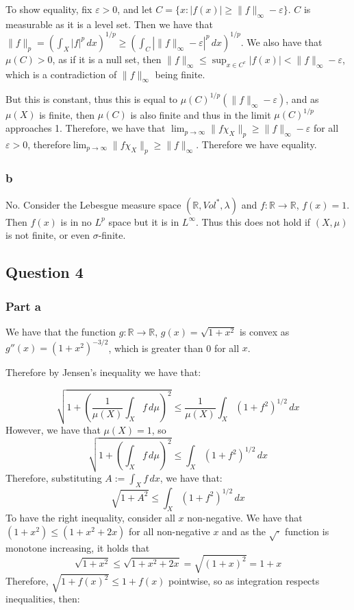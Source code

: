 \documentclass{article}
\theoremstyle{definition}
\numberwithin{theorem}{section}
\numberwithin{equation}{section}
\begin{document}
To show equality, fix $\varepsilon > 0$, and let $C = \lbrace x : |f(x)| \geq \| f \|_{\infty} - \varepsilon \rbrace$. $C$ is measurable as it is a level set. Then we have that $ \|f \|_p = \left(\int_X |f|^p \, dx \right)^{1/p} \geq \left(\int_C |\| f \|_{\infty} - \varepsilon|^p \, dx \right)^{1/p}$. We also have that $\mu(C) > 0$, as if it is a null set, then $\|f \|_{\infty} \leq \sup_{x \in C^c} |f(x)| < \|f\|_{\infty} - \varepsilon$, which is a contradiction of $\|f \|_{\infty}$ being finite. 

But this is constant, thus this is equal to $\mu(C)^{1/p}( \| f \|_{\infty} - \varepsilon)$, and as $\mu(X)$ is finite, then $\mu(C)$ is also finite and thus in the limit $\mu(C)^{1/p}$ approaches 1. Therefore, we have that $\lim_{p \rightarrow \infty} \| f \chi_X \|_p \geq \|f \|_{\infty} - \varepsilon$ for all $\varepsilon > 0$, therefore$\lim_{p \rightarrow \infty} \| f \chi_X \|_p \geq \|f \|_{\infty}$. Therefore we have equality.
\subsubsection*{b}
No. Consider the Lebesgue measure space $(\mathbb{R}, Vol^*, \lambda)$ and $f : \mathbb{R} \rightarrow \mathbb{R}$, $f(x) = 1$. Then $f(x)$ is in no $L^p$ space but it is in $L^\infty$. Thus this does not hold if $(X, \mu)$ is not finite, or even $\sigma$-finite. 
\subsection*{Question 4}
\subsubsection*{Part a}
We have that the function $g: \mathbb{R} \rightarrow \mathbb{R}$, $g(x) = \sqrt{1 + x^2}$ is convex as $g''(x) = (1 + x^2)^{-3/2}$, which is greater than 0 for all $x$. 

Therefore by Jensen's inequality we have that:

\begin{equation}
	\sqrt{1 + \left(\frac{1}{\mu(X)} \int_X f \, d\mu\right)^2} \leq \frac{1}{\mu(X)} \int_X \left(1 + f^2\right)^{1/2} \, dx
\end{equation}
However, we have that $\mu(X) = 1$, so 
\begin{equation}
	\sqrt{1 + \left( \int_X f \, d\mu\right)^2} \leq \int_X \left(1 + f^2\right)^{1/2} \, dx
\end{equation}
Therefore, substituting $A := \int_X f \, dx$, we have that:
\begin{equation}
	\sqrt{1 + A^2} \leq \int_X \left(1 + f^2\right)^{1/2} \, dx
\end{equation}
To have the right inequality, consider all $x$ non-negative. We have that $(1 + x^2) \leq (1 + x^2 + 2x)$ for all non-negative $x$ and as the $\sqrt{ \cdot }$ function is monotone increasing, it holds that
\begin{equation}
	\sqrt{1 + x^2} \leq \sqrt{1 + x^2 + 2x} = \sqrt{(1 + x)^2} = 1 + x
\end{equation}
Therefore, $\sqrt{1 + f(x)^2} \leq 1 + f(x)$ pointwise, so as integration respects inequalities, then:
\end{document}

